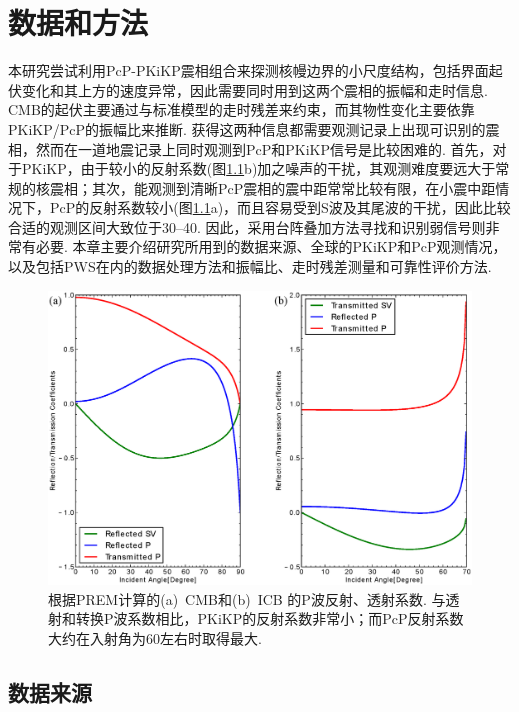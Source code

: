 \chapter{数据和方法}

本研究尝试利用PcP-PKiKP震相组合来探测核幔边界的小尺度结构，包括界面起伏变化和其上方的速度异常，因此需要同时用到这两个震相的振幅和走时信息. CMB的起伏主要通过与标准模型的走时残差来约束，而其物性变化主要依靠PKiKP/PcP的振幅比来推断. 获得这两种信息都需要观测记录上出现可识别的震相，然而在一道地震记录上同时观测到PcP和PKiKP信号是比较困难的. 首先，对于PKiKP，由于较小的反射系数(图\ref{fig:rtf}b)加之噪声的干扰，其观测难度要远大于常规的核震相；其次，能观测到清晰PcP震相的震中距常常比较有限，在小震中距情况下，PcP的反射系数较小(图\ref{fig:rtf}a)，而且容易受到S波及其尾波的干扰，因此比较合适的观测区间大致位于30{\textdegree}--40{\textdegree}. 因此，采用台阵叠加方法寻找和识别弱信号则非常有必要. 本章主要介绍研究所用到的数据来源、全球的PKiKP和PcP观测情况，以及包括PWS在内的数据处理方法和振幅比、走时残差测量和可靠性评价方法. 


\begin{figure}[!ht]
		\centering
\includegraphics[width=0.9\linewidth]{fig/chap2/cmb_icb.eps}
		\caption{根据PREM计算的(a)~CMB和(b)~ICB 的P波反射、透射系数. 与透射和转换P波系数相比，PKiKP的反射系数非常小；而PcP反射系数大约在入射角为60{\textdegree}左右时取得最大. }
		\label{fig:rtf}
\end{figure}


\section{数据来源}

